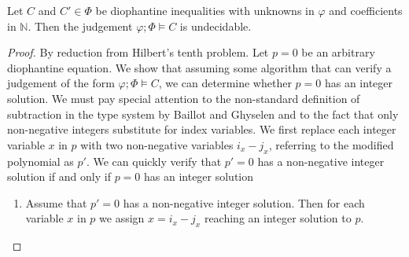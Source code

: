 \begin{lemma}\label{lemma:judgementUndecidable}
Let $C$ and $C'\in \Phi$ be diophantine inequalities with unknowns in $\varphi$ and coefficients in $\mathbb{N}$. Then the judgement $\varphi;\Phi\vDash C$ is undecidable.
\begin{proof}
By reduction from Hilbert's tenth problem. Let $p=0$ be an arbitrary diophantine equation. We show that assuming some algorithm that can verify a judgement of the form $\varphi;\Phi\vDash C$, we can determine whether $p=0$ has an integer solution. We must pay special attention to the non-standard definition of subtraction in the type system by Baillot and Ghyselen \cite{BaillotGhyselen2021} and to the fact that only non-negative integers substitute for index variables. We first replace each integer variable $x$ in $p$ with two non-negative variables $i_x - j_x$, referring to the modified polynomial as $p'$. We can quickly verify that $p'=0$ has a non-negative integer solution if and only if $p=0$ has an integer solution
\begin{enumerate}
    \item Assume that $p'=0$ has a non-negative integer solution. Then for each variable $x$ in $p$ we assign $x = i_x - j_x$ reaching an integer solution to $p$.
    

\end{enumerate}
\end{proof}
\end{lemma}
